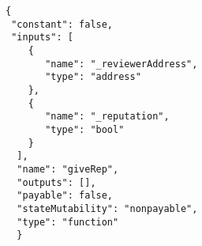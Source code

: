 \begin{lstlisting}[frame=single,caption=ABI fragment example,label=abi]
 {
 "constant": false,
 "inputs": [ 
    { 
       "name": "_reviewerAddress",
       "type": "address"
    },
    { 
       "name": "_reputation", 
       "type": "bool" 
    } 
  ], 
  "name": "giveRep", 
  "outputs": [], 
  "payable": false, 
  "stateMutability": "nonpayable", 
  "type": "function" 
  } 
\end{lstlisting}